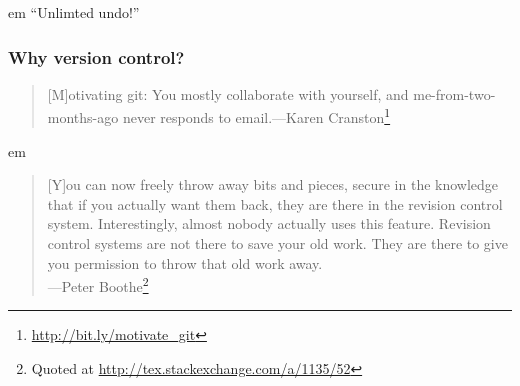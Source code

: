 \documentclass[aspectratio=1610]{beamer}
\begin{document}
\begin{frame}
{\begin{minipage}{\textwidth}

\end{minipage}
}
\pause
{} em
``Unlimted undo!''

\end{frame}

\begin{frame}
\frametitle{Why version control?}

\begin{quote}[M]otivating git: You mostly collaborate with yourself, and me-from-two-months-ago never responds to email.---Karen Cranston\footnote{\url{http://bit.ly/motivate_git}}
\end{quote}

\pause

 em


\begin{quote}
  [Y]ou can now freely throw away bits and pieces, secure in the knowledge that if you actually want them back, they are there in the revision control system. Interestingly, almost nobody actually uses this feature. Revision control systems are not there to save your old work. They are there to give you permission to throw that old work away.\\
  ---Peter Boothe\footnote{Quoted at \url{http://tex.stackexchange.com/a/1135/52}}
\end{quote}

\end{frame}
\end{document}
